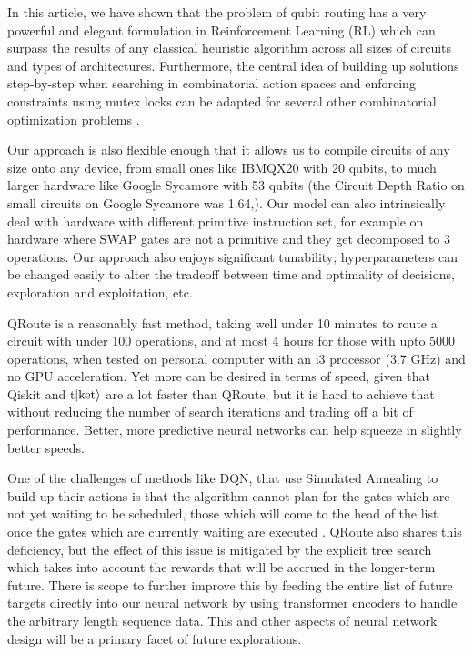 \documentclass[%
 reprint,
amsmath,amssymb,
pra,
]{revtex4-2}
\begin{document}
In this article, we have shown that the problem of qubit routing has a very powerful and elegant formulation in Reinforcement Learning (RL) which can surpass the results of any classical heuristic algorithm across all sizes of circuits and types of architectures. Furthermore, the central idea of building up solutions step-by-step when searching in  combinatorial action spaces and enforcing constraints using mutex locks can be adapted for several other combinatorial optimization problems \citep{comb_survey, comb_1, comb_2, comb_3, comb_4}.

Our approach is also flexible enough that it allows us to compile circuits of any size onto any device, from small ones like IBMQX20 with 20 qubits, to much larger hardware like Google Sycamore with 53 qubits (the Circuit Depth Ratio on small circuits on Google Sycamore was 1.64,). Our model can also intrinsically deal with hardware with different primitive instruction set, for example on hardware where SWAP gates are not a primitive and they get decomposed to 3 operations. Our approach also enjoys significant tunability; hyperparameters can be changed easily to alter the tradeoff between time and optimality of decisions, exploration and exploitation, etc.

QRoute is a reasonably fast method, taking well under 10 minutes to route a circuit with under 100 operations, and at most 4 hours for those with upto 5000 operations, when tested on personal computer with an i3 processor (3.7 GHz) and no GPU acceleration. Yet more can be desired in terms of speed, given that Qiskit and t$\ket{\text{ket}}$ are a lot faster than QRoute, but it is hard to achieve that without reducing the number of search iterations and trading off a bit of performance. Better, more predictive neural networks can help squeeze in slightly better speeds.

One of the challenges of methods like DQN, that use Simulated Annealing to build up their actions is that the algorithm cannot plan for the gates which are not yet waiting to be scheduled, those which will come to the head of the list once the gates which are currently waiting are executed \citep{qroute_dqn2}. QRoute also shares this deficiency, but the effect of this issue is mitigated by the explicit tree search which takes into account the rewards that will be accrued in the longer-term future. There is scope to further improve this by feeding the entire list of future targets directly into our neural network by using transformer encoders to handle the arbitrary length sequence data. This and other aspects of neural network design will be a primary facet of future explorations. %
\end{document}
